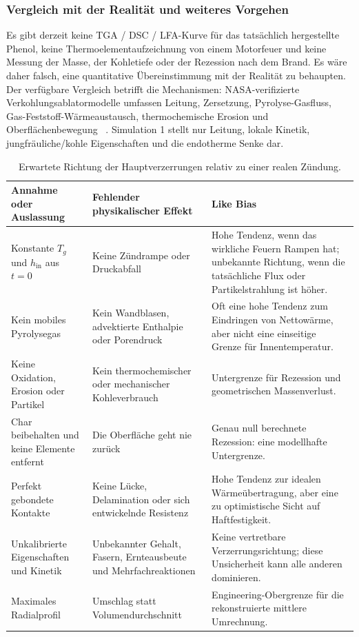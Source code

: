 \documentclass[oneside,openany]{amsdtx}
\begin{document}
\subsubsection{Vergleich mit der Realität und weiteres Vorgehen}

Es gibt derzeit keine TGA / DSC / LFA-Kurve für das tatsächlich hergestellte Phenol, keine Thermoelementaufzeichnung von einem Motorfeuer und keine Messung der Masse, der Kohletiefe oder der Rezession nach dem Brand. Es wäre daher falsch, eine quantitative Übereinstimmung mit der Realität zu behaupten. Der verfügbare Vergleich betrifft die Mechanismen: NASA-verifizierte Verkohlungsablatormodelle umfassen Leitung, Zersetzung, Pyrolyse-Gasfluss, Gas-Feststoff-Wärmeaustausch, thermochemische Erosion und Oberflächenbewegung ~\cite{ewing2013,amar2010,amar2016}. Simulation 1 stellt nur Leitung, lokale Kinetik, jungfräuliche/kohle Eigenschaften und die endotherme Senke dar.

\begin{table}[H]
\centering
\footnotesize
\renewcommand{\arraystretch}{1.18}
\begin{tabular}{L{0.25\textwidth}L{0.34\textwidth}L{0.31\textwidth}}
\toprule
\textbf{Annahme oder Auslassung} & \textbf{Fehlender physikalischer Effekt} &
\textbf{Like Bias} \\
\midrule
Konstante \(T_g\) und \(h_\mathrm{in}\) aus \(t=0\) &
Keine Zündrampe oder Druckabfall &
Hohe Tendenz, wenn das wirkliche Feuern Rampen hat; unbekannte Richtung, wenn die tatsächliche
Flux oder Partikelstrahlung ist höher. \\
Kein mobiles Pyrolysegas &
Kein Wandblasen, advektierte Enthalpie oder Porendruck &
Oft eine hohe Tendenz zum Eindringen von Nettowärme, aber nicht eine einseitige Grenze
für Innentemperatur. \\
Keine Oxidation, Erosion oder Partikel &
Kein thermochemischer oder mechanischer Kohleverbrauch &
Untergrenze für Rezession und geometrischen Massenverlust. \\
Char beibehalten und keine Elemente entfernt &
Die Oberfläche geht nie zurück &
Genau null berechnete Rezession: eine modellhafte Untergrenze. \\
Perfekt gebondete Kontakte &
Keine Lücke, Delamination oder sich entwickelnde Resistenz &
Hohe Tendenz zur idealen Wärmeübertragung, aber eine zu optimistische Sicht auf
Haftfestigkeit. \\
Unkalibrierte Eigenschaften und Kinetik &
Unbekannter Gehalt, Fasern, Ernteausbeute und Mehrfachreaktionen &
Keine vertretbare Verzerrungsrichtung; diese Unsicherheit kann alle anderen dominieren. \\
Maximales Radialprofil &
Umschlag statt Volumendurchschnitt &
Engineering-Obergrenze für die rekonstruierte mittlere Umrechnung. \\
\bottomrule
\end{tabular}~\\[1em]
\caption{Erwartete Richtung der Hauptverzerrungen relativ zu einer realen Zündung.}
\label{tab:sim1-reality-bounds}
\end{table}
\end{document}
